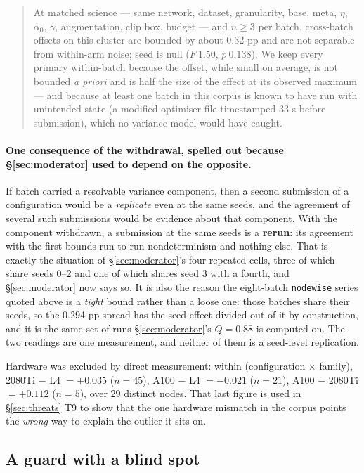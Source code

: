 \documentclass[10pt,letterpaper]{article}
\newcommand{\arm}[1]{\texttt{#1}}
\begin{document}
\begin{quote}
At matched science --- same network, dataset, granularity, base, meta, $\eta$, $\alpha_0$,
$\gamma$, augmentation, clip box, budget --- and $n \ge 3$ per batch, cross-batch offsets on this
cluster are bounded by about 0.32 pp and are not separable from within-arm noise; seed is null
($F\ 1.50$, $p\ 0.138$). We keep every primary within-batch because the offset, while small on
average, is not bounded \emph{a priori} and is half the size of the effect at its observed maximum
--- and because at least one batch in this corpus is known to have run with unintended state (a
modified optimiser file timestamped 33 s before submission), which no variance model would have
caught.
\end{quote}

\paragraph{One consequence of the withdrawal, spelled out because \S\ref{sec:moderator} used to
depend on the opposite.}
If batch carried a resolvable variance component, then a second submission of a configuration
would be a \emph{replicate} even at the same seeds, and the agreement of several such submissions
would be evidence about that component. With the component withdrawn, a submission at the same
seeds is a \textbf{rerun}: its agreement with the first bounds run-to-run nondeterminism and
nothing else. That is exactly the situation of \S\ref{sec:moderator}'s four repeated cells, three
of which share seeds 0--2 and one of which shares seed 3 with a fourth, and \S\ref{sec:moderator}
now says so. It is also the reason the eight-batch \arm{nodewise} series quoted above is a
\emph{tight} bound rather than a loose one: those batches share their seeds, so the 0.294 pp
spread has the seed effect divided out of it by construction, and it is the same set of runs
\S\ref{sec:moderator}'s $Q = 0.88$ is computed on. The two readings are one measurement, and
neither of them is a seed-level replication.

Hardware was excluded by direct measurement: within (configuration $\times$ family),
2080Ti $-$ L4 $= +0.035$ ($n = 45$), A100 $-$ L4 $= -0.021$ ($n = 21$), A100 $-$ 2080Ti
$= +0.112$ ($n = 5$), over 29 distinct nodes. That last figure is used in \S\ref{sec:threats} T9 to
show that the one hardware mismatch in the corpus points the \emph{wrong} way to explain the
outlier it sits on.

\subsection{A guard with a blind spot}
\label{sec:blindspot}
\end{document}
